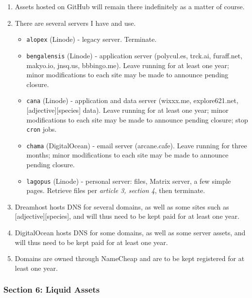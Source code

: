\begin{enumerate}
\def\labelenumi{\arabic{enumi}.}
\tightlist
\item
  Assets hosted on GitHub will remain there indefinitely as a matter of course.
\item
  There are several servers I have and use.

  \begin{itemize}
  \tightlist
  \item
    \texttt{alopex} (Linode) - legacy server. Terminate.
  \item
    \texttt{bengalensis} (Linode) - application server (polycul.es, trck.ai, furaff.net, makyo.io, jnsq.us, bbbingo.me). Leave running for at least one year; minor modifications to each site may be made to announce pending closure.
  \item
    \texttt{cana} (Linode) - application and data server (wixxx.me, explore621.net, {[}adjective{]}{[}species{]} data). Leave running for at least one year; minor modifications to each site may be made to announce pending closure; stop \texttt{cron} jobs.
  \item
    \texttt{chama} (DigitalOcean) - email server (arcane.cafe). Leave running for three months; minor modifications to each site may be made to announce pending closure.
  \item
    \texttt{lagopus} (Linode) - personal server: files, Matrix server, a few simple pages. Retrieve files per \emph{article 3, section 4}, then terminate.
  \end{itemize}
\item
  Dreamhost hosts DNS for several domains, as well as some sites such as {[}adjective{]}{[}species{]}, and will thus need to be kept paid for at least one year.
\item
  DigitalOcean hosts DNS for some domains, as well as some server assets, and will thus need to be kept paid for at least one year.
\item
  Domains are owned through NameCheap and are to be kept registered for at least one year.
\end{enumerate}

\subsubsection*{Section 6: Liquid Assets}\label{section-6-liquid-assets}

